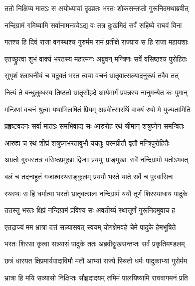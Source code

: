 
\twolineshloka
{ततो निक्षिप्य मातऽः स अयोध्यायां दृढव्रतः}
{भरतः शोकसन्तप्तो गुरूनिदमथाब्रवीत्} %

\twolineshloka
{नन्दिग्रामं गमिष्यामि सर्वानामन्त्रयेऽद्य वः}
{तत्र दुःखमिदं सर्वं सहिष्ये राघवं विना} %

\twolineshloka
{गतश्च हि दिवं राजा वनस्थश्च गुरुर्मम}
{रामं प्रतीक्षे राज्याय स हि राजा महायशाः} %

\twolineshloka
{एतच्छ्रुत्वा शुभं वाक्यं भरतस्य महात्मनः}
{अब्रुवन् मन्त्रिणः सर्वे वसिष्ठश्च पुरोहितः} %

\twolineshloka
{सुभृशं श्लाघनीयं च यदुक्तं भरत त्वया}
{वचनं भ्रातृवात्सल्यादनुरूपं तवैव तत्} %

\twolineshloka
{नित्यं ते बन्धुलुब्धस्य तिष्ठतो भ्रातृसौहृदे}
{आर्यमार्गं प्रपन्नस्य नानुमन्येत कः पुमान्} %

\twolineshloka
{मन्त्रिणां वचनं श्रुत्वा यथाभिलषितं प्रियम्}
{अब्रवीत्सारथिं वाक्यं रथो मे युज्यतामिति} %

\twolineshloka
{प्रहृष्टवदनः सर्वा मातऽः समभिवाद्य सः}
{आरुरोह रथं श्रीमान् शत्रुघ्नेन समन्वितः} %

\twolineshloka
{आरुह्य च रथं शीघ्रं शत्रुघ्नभरतावुभौ}
{ययतुः परमप्रीतौ वृतौ मन्त्रिपुरोहितैः} %

\twolineshloka
{अग्रतो गुरवस्तत्र वसिष्ठप्रमुखा द्विजाः}
{प्रययुः प्राङ्मुखाः सर्वे नन्दिग्रामो यतोऽभवत्} %

\twolineshloka
{बलं च तदनाहूतं गजाश्वरथसङ्कुलम्}
{प्रययौ भरते याते सर्वे च पुरवासिनः} %

\twolineshloka
{रथस्थः स हि धर्मात्मा भरतो भ्रातृवत्सलः}
{नन्दिग्रामं ययौ तूर्णं शिरस्याधाय पादुके} %

\twolineshloka
{ततस्तु भरतः क्षिप्रं नन्दिग्रामं प्रविश्य सः}
{अवतीर्य्य रथात्तूर्णं गुरूनिदमुवाच ह} %

\twolineshloka
{एतद्राज्यं मम भ्रात्रा दत्तं सन्न्यासवत् स्वयम्}
{योगक्षेमवहे चेमे पादुके हेमभूषिते} %

\twolineshloka
{भरतः शिरसा कृत्वा सन्न्यासं पादुके ततः}
{अब्रवीद्दुःखसन्तप्तः सर्वं प्रकृतिमण्डलम्} %

\twolineshloka
{छत्रं धारयत क्षिप्रमार्यपादाविमौ मतौ}
{आभ्यां राज्ये स्थितो धर्मः पादुकाभ्यां गुरोर्मम} %

\twolineshloka
{भ्रात्रा हि मयि सन्न्यासो निक्षिप्तः सौहृदादयम्}
{तमिमं पालयिष्यामि राघवागमनं प्रति} %

